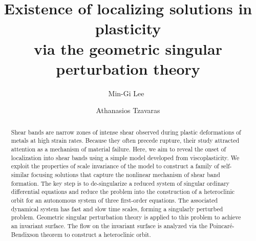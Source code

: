 \documentclass[a4paper,11pt]{article}
\numberwithin{step}{dummy}
\begin{document}
\title{Existence of localizing solutions in plasticity \\ via the geometric singular perturbation theory}
\author{Min-Gi Lee\footnotemark[1]\  \footnotemark[2]
\and Athanasios Tzavaras\footnotemark[1]}
\date{}

\maketitle
\renewcommand{\thefootnote}{\fnsymbol{footnote}}
\renewcommand{\thefootnote}{\arabic{footnote}}


\begin{abstract}
Shear bands are narrow zones of intense shear observed during  plastic deformations of metals at high strain rates. Because they often precede rupture, 
their study attracted attention as a mechanism of material failure.  
Here, we aim to reveal the onset of localization into shear bands using a simple model developed from viscoplasticity.
We  exploit the properties of scale invariance of the model to construct a family of self-similar focusing solutions that capture 
the nonlinear mechanism of  shear band formation. The key step is to de-singularize a reduced  system of singular ordinary differential equations 
and reduce the problem into the construction of a heteroclinic orbit for an autonomous system  of three first-order equations. 
The associated  dynamical system has  fast and slow time scales, forming a singularly perturbed problem.  
Geometric singular perturbation theory is applied to this problem to achieve an invariant surface. The flow on
the invariant surface  is analyzed via the Poincar\'{e}-Bendixson theorem to construct a heteroclinic orbit. 
\end{abstract}

% 
\end{document}
